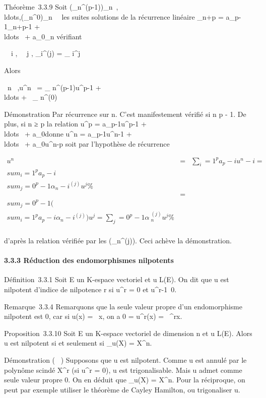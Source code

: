\documentclass[]{article}
\begin{document}
Théorème~3.3.9 Soit
(\alpha_n^(p-1))_n\in{}~,\\ldots,(\alpha_n^0)_n\in{}~~
les suites solutions de la récurrence linéaire \alpha_n+p =
a_p-1\alpha_n+p-1 +
\\ldots~ +
a_0\alpha_n vérifiant

\forall~~i \in [0,p - 1],
\forall~~j \in [0,p - 1],\quad
\alpha_i^(j) = \delta_ i^j

Alors

\forall~n \in {}~,\quad u^n~ =
\alpha_ n^(p-1)u^p-1 +
\\ldots + \alpha~_
n^(0)\mathrmId

Démonstration Par récurrence sur n. C'est manifestement vérifié si n \leq p
- 1. De plus, si n ≥ p la relation u^p =
a_p-1u^p-1 +
\\ldots~ +
a_0\mathrmId donne u^n =
a_p-1u^n-1 +
\\ldots~ +
a_0u^n-p soit par l'hypothèse de récurrence

\begin{align*} u^n& =&
\sum _i=1^pa_
p-iu^n-i = \\sum
_i=1^pa_ p-i \\sum
_j=0^p-1\alpha_ n-i^(j)u^j \%&
\\ & =& \\sum
_j=0^p-1(\\sum
_i=1^pa_
p-i\alpha_n-i^(j))u^j =
\sum _j=0^p-1\alpha~_
n^(j)u^j\%& \\
\end{align*}

d'après la relation vérifiée par les (\alpha_n^(j)). Ceci
achève la démonstration.

\paragraph{3.3.3 Réduction des endomorphismes nilpotents}

Définition~3.3.1 Soit E un K-espace vectoriel et u \in L(E). On dit que u
est nilpotent d'indice de nilpotence r si u^r = 0 et
u^r-1\neq~0.

Remarque~3.3.4 Remarquons que la seule valeur propre d'un endomorphisme
nilpotent est 0, car si u(x) = \lambda~x, on a 0 = u^r(x) =
\lambda~^rx.

Proposition~3.3.10 Soit E un K-espace vectoriel de dimension n et u \in
L(E). Alors u est nilpotent si et seulement si \chi_u(X) =
X^n.

Démonstration ( \rigtharrow~) Supposons que u est nilpotent. Comme u est annulé par
le polynôme scindé X^r (si u^r = 0), u est
trigonalisable. Mais u admet comme seule valeur propre 0. On en déduit
que \chi_u(X) = X^n. Pour la réciproque, on peut par
exemple utiliser le théorème de Cayley Hamilton, ou trigonaliser u.
\end{document}
